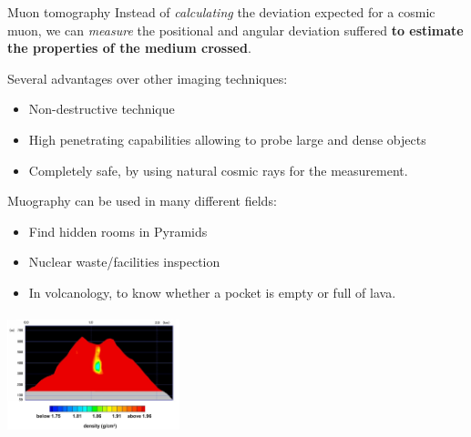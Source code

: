 \documentclass[8 pt]{beamer}
\begin{document}
\begin{frame}{Muon tomography}
Instead of \textit{calculating} the deviation expected for a cosmic muon, we can \textit{measure} the positional and angular deviation suffered \textbf{to estimate the properties of the medium crossed}. \vfill

Several advantages over other imaging techniques:
\begin{itemize}
\justifying
\item Non-destructive technique
\item High penetrating capabilities allowing to probe large and dense objects
\item Completely safe, by using natural cosmic rays for the measurement.
\end{itemize} \vspace{10pt}

\begin{minipage}[c]{.54\textwidth}
\justifying

	Muography can be used in many different fields:
\begin{itemize}
	\justifying
	\item Find hidden rooms in Pyramids
	\item Nuclear waste/facilities inspection
	\item In volcanology, to know whether a pocket is empty or full of lava.
\end{itemize}	
	
\end{minipage} \hfill
\begin{minipage}[c]{.44\textwidth}
	\begin{center}
	\includegraphics[width=5cm, height=3.5cm]{figs/volcano.jpg}
	\end{center}
\end{minipage} \hfill \vfill
\end{frame}
\end{document}
